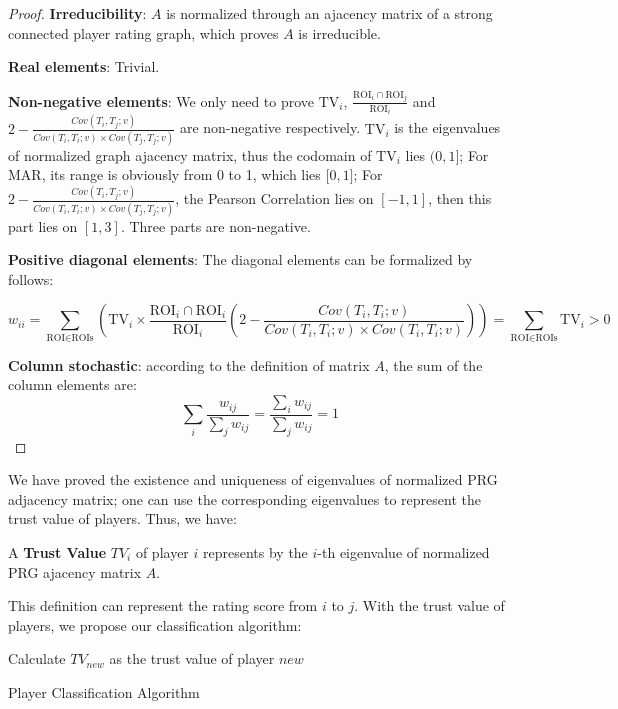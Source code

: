 \begin{proof}
\textbf{Irreducibility}: $A$ is normalized through an ajacency matrix of a strong connected player
rating graph, which proves $A$ is irreducible.

\textbf{Real elements}: Trivial.

\textbf{Non-negative elements}: We only need to prove $\text{TV}_i$, 
$\frac{\text{ROI}_i\cap\text{ROI}_j}{\text{ROI}_i}$ and 
$2-\frac{Cov(T_i, T_j; v)}{Cov(T_i, T_i; v)\times Cov(T_j, T_j; v)}$ are non-negative 
respectively. $\text{TV}_i$ is the eigenvalues of normalized graph ajacency matrix, 
thus the codomain of $\text{TV}_i$ lies $(0, 1\rbrack$; For MAR, its range is obviously from 0 to 1,
which lies $\lbrack 0, 1 \rbrack$; For $2-\frac{Cov(T_i, T_j; v)}{Cov(T_i, T_i; v)\times Cov(T_j, T_j; v)}$,
the Pearson Correlation lies on $[-1, 1]$, then this part lies on $[1, 3]$.
Three parts are non-negative.
  
\textbf{Positive diagonal elements}: The diagonal elements can be formalized by follows:

\[
w_{ii} = 
\sum_{\text{ROI}\in\text{ROIs}}{\left(
  \text{TV}_i \times
  \frac{\text{ROI}_i\cap\text{ROI}_i}{\text{ROI}_i}
  \left( 2-\frac{Cov(T_i, T_i; v)}
      {Cov(T_i, T_i; v)\times Cov(T_i, T_i; v)} \right)\right)
} = \sum_{\text{ROI}\in\text{ROIs}}{\text{TV}_i} > 0
\]

\textbf{Column stochastic}: according to the definition of matrix $A$, the sum of the column
elements are:
\[
  \sum_{i}{\frac{w_{ij}}{\sum_{j}{w_{ij}}}} 
  = \frac{\sum_{i}{w_{ij}}}{\sum_{j}{w_{ij}}} = 1
\]
\end{proof}

We have proved the existence and uniqueness of eigenvalues of normalized PRG adjacency matrix; 
one can use the corresponding eigenvalues to represent the trust value of players. Thus, we have:

\begin{definition}
A \textbf{Trust Value} $TV_i$ of player $i$ represents by the $i$-th eigenvalue of normalized PRG ajacency matrix $A$.
\end{definition}

This definition can represent the rating score from $i$ to $j$. With the trust value of players,
we propose our classification algorithm:

\begin{algorithm}[H]
\SetAlgoLined
{}
Calculate $TV_{new}$ as the trust value of player $new$ \;
\caption{Player Classification Algorithm}
\end{algorithm}


